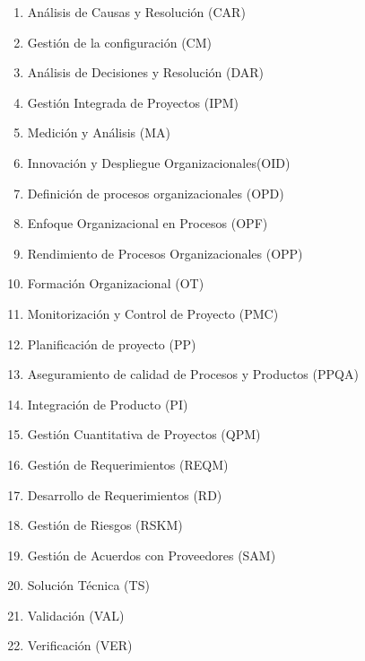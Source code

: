 \begin{enumerate}
\item An\'alisis de Causas y Resoluci\'on (CAR)
\item Gesti\'on de la configuraci\'on (CM)
\item An\'alisis de Decisiones y Resoluci\'on (DAR)
\item Gesti\'on Integrada de Proyectos (IPM)
\item Medici\'on y An\'alisis (MA)
\item Innovaci\'on y Despliegue Organizacionales(OID)
\item Definici\'on de procesos organizacionales (OPD)
\item Enfoque Organizacional en Procesos (OPF)
\item Rendimiento de Procesos Organizacionales (OPP)
\item Formaci\'on Organizacional (OT)
\item Monitorizaci\'on y Control de Proyecto (PMC)
\item Planificaci\'on de proyecto (PP)
\item Aseguramiento de calidad de Procesos y Productos (PPQA)
\item Integraci\'on de Producto (PI)
\item Gesti\'on Cuantitativa de Proyectos (QPM)
\item Gesti\'on de Requerimientos (REQM)
\item Desarrollo de Requerimientos (RD)
\item Gesti\'on de Riesgos (RSKM)
\item Gesti\'on de Acuerdos con Proveedores (SAM)
\item Soluci\'on T\'ecnica (TS)
\item Validaci\'on (VAL)
\item Verificaci\'on (VER)

\end{enumerate}



